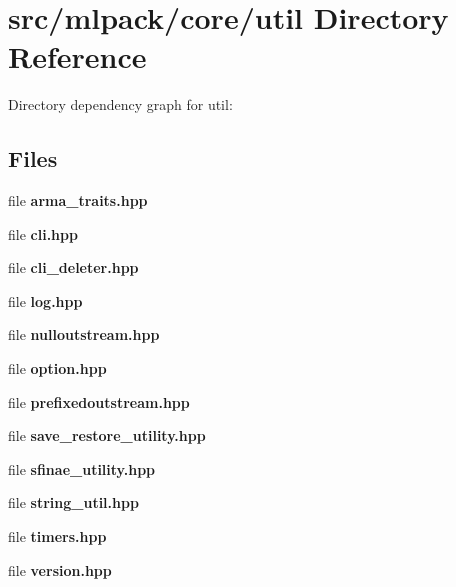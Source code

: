 \section{src/mlpack/core/util Directory Reference}
\label{dir_c4303c2bc564a6ca2e5675e038530c72}
Directory dependency graph for util\-:
\subsection*{Files}
\begin{DoxyCompactItemize}
\item 
file {\bf arma\-\_\-traits.\-hpp}
\item 
file {\bf cli.\-hpp}
\item 
file {\bf cli\-\_\-deleter.\-hpp}
\item 
file {\bf log.\-hpp}
\item 
file {\bf nulloutstream.\-hpp}
\item 
file {\bf option.\-hpp}
\item 
file {\bf prefixedoutstream.\-hpp}
\item 
file {\bf save\-\_\-restore\-\_\-utility.\-hpp}
\item 
file {\bf sfinae\-\_\-utility.\-hpp}
\item 
file {\bf string\-\_\-util.\-hpp}
\item 
file {\bf timers.\-hpp}
\item 
file {\bf version.\-hpp}
\end{DoxyCompactItemize}
